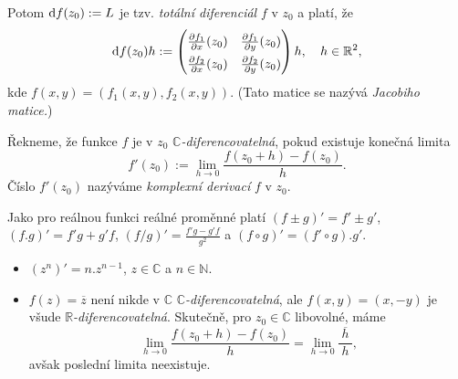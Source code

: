 \begin{note}

Potom $\mathop{}\!\mathrm{d} f(z_0):=L$ je tzv. \emph{totální diferenciál} $f$ v $z_0$ a platí, že 
$$\diff f(z_0)h:=
\renewcommand\arraystretch{1.5}
\begin{pmatrix}
\frac{\partial f_1}{\partial x}(z_0) & \frac{\partial f_1}{\partial y}(z_0)\\
\frac{\partial f_2}{\partial x}(z_0) & \frac{\partial f_2}{\partial y}(z_0)
\end{pmatrix}h\text{,\hspace{3mm} }h\in \mathbb{R}^2\text{,}$$
kde $f(x,y) = (f_1(x,y),f_2(x,y)).$ (Tato matice se nazývá \emph{Jacobiho matice.})
\end{note} 


\begin{definition}
Řekneme, že funkce $f$ je v $z_0$ $\mathbb{C}$\emph{-diferencovatelná}, pokud existuje konečná limita 
\[f'(z_0):= \lim_{h \to 0}\frac{f(z_0+h)-f(z_0)}{h}.\] 
Číslo $f'(z_0)$ nazýváme \emph{komplexní derivací} $f$ v $z_0$. 
\end{definition}  

\begin{note}
Jako pro reálnou funkci reálné proměnné platí $(f\pm g)'=f'\pm{g'}$, $(f.g)'=f'g+g'f$, $(f/g)'=\frac{f'g-g'f}{g^2}$ a $(f\circ g)'=(f'\circ{g}).g'$.

\end{note} 

\begin{example}\mbox{}
\begin{itemize}
    \item $(z^n)' = n.z^{n-1}$, $z\in \mathbb{C}$ a $n\in \mathbb{N}\text{.}$
    \item $f(z) = \overline{z}$ není nikde v $\mathbb{C}$ $\mathbb{C}$\emph{-diferencovatelná}, ale $f(x,y) = (x,-y)$ je všude $\mathbb{R}$\emph{-diferencovatelná}. Skutečně, pro $z_0\in\mathbb{C}$ libovolné, máme $$\lim_{h\to 0}\frac{f(z_0+h)-f(z_0)}{h} = \lim_{h\to 0}\frac{\ \overline{h}\ }{h}\text{,}$$ avšak poslední limita neexistuje. 
    \end{itemize}
\end{example}


